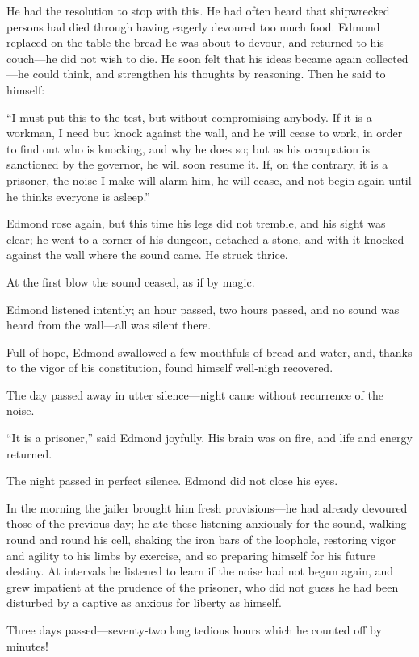 He had the resolution to stop with this. He had often heard that
shipwrecked persons had died through having eagerly devoured too much
food. Edmond replaced on the table the bread he was about to devour,
and returned to his couch—he did not wish to die. He soon felt that his
ideas became again collected—he could think, and strengthen his
thoughts by reasoning. Then he said to himself:

“I must put this to the test, but without compromising anybody. If it
is a workman, I need but knock against the wall, and he will cease to
work, in order to find out who is knocking, and why he does so; but as
his occupation is sanctioned by the governor, he will soon resume it.
If, on the contrary, it is a prisoner, the noise I make will alarm him,
he will cease, and not begin again until he thinks everyone is asleep.”

Edmond rose again, but this time his legs did not tremble, and his
sight was clear; he went to a corner of his dungeon, detached a stone,
and with it knocked against the wall where the sound came. He struck
thrice.

At the first blow the sound ceased, as if by magic.

Edmond listened intently; an hour passed, two hours passed, and no
sound was heard from the wall—all was silent there.

Full of hope, Edmond swallowed a few mouthfuls of bread and water, and,
thanks to the vigor of his constitution, found himself well-nigh
recovered.

The day passed away in utter silence—night came without recurrence of
the noise.

“It is a prisoner,” said Edmond joyfully. His brain was on fire, and
life and energy returned.

The night passed in perfect silence. Edmond did not close his eyes.

In the morning the jailer brought him fresh provisions—he had already
devoured those of the previous day; he ate these listening anxiously
for the sound, walking round and round his cell, shaking the iron bars
of the loophole, restoring vigor and agility to his limbs by exercise,
and so preparing himself for his future destiny. At intervals he
listened to learn if the noise had not begun again, and grew impatient
at the prudence of the prisoner, who did not guess he had been
disturbed by a captive as anxious for liberty as himself.

Three days passed—seventy-two long tedious hours which he counted off
by minutes!

